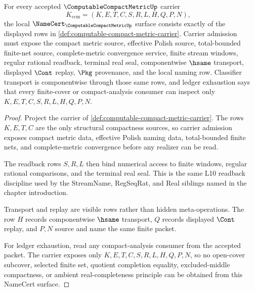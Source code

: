\begin{theorem}
\label{thm:computable-compact-metric-namecert-obligations}
For every accepted $\ComputableCompactMetricUp$ carrier
$$
K_{\mathrm{ccm}}=(K,E,T,C,S,R,L,H,Q,P,N),
$$
the local $\NameCert_{\ComputableCompactMetricUp}$ surface consists exactly of the displayed rows in \autoref{def:computable-compact-metric-carrier}. Carrier admission must expose the compact metric source, effective Polish source, total-bounded finite-net source, complete-metric convergence service, finite stream windows, regular rational readback, terminal real seal, componentwise $\hsame$ transport, displayed $\Cont$ replay, $\Pkg$ provenance, and the local naming row. Classifier transport is componentwise through those same rows, and ledger exhaustion says that every finite-cover or compact-analysis consumer can inspect only $K,E,T,C,S,R,L,H,Q,P,N$.
\end{theorem}
\begin{proof}
Project the carrier of \autoref{def:computable-compact-metric-carrier}. The rows $K,E,T,C$ are the only structural compactness sources, so carrier admission exposes compact metric data, effective Polish naming data, total-bounded finite nets, and complete-metric convergence before any realizer can be read.

The readback rows $S,R,L$ then bind numerical access to finite windows, regular rational comparisons, and the terminal real seal. This is the same L10 readback discipline used by the StreamName, RegSeqRat, and Real siblings named in the chapter introduction.

Transport and replay are visible rows rather than hidden meta-operations. The row $H$ records componentwise $\hsame$ transport, $Q$ records displayed $\Cont$ replay, and $P,N$ source and name the same finite packet.

For ledger exhaustion, read any compact-analysis consumer from the accepted packet. The carrier exposes only $K,E,T,C,S,R,L,H,Q,P,N$, so no open-cover subcover, selected finite set, quotient completion equality, excluded-middle compactness, or ambient real-completeness principle can be obtained from this NameCert surface.
\end{proof}


